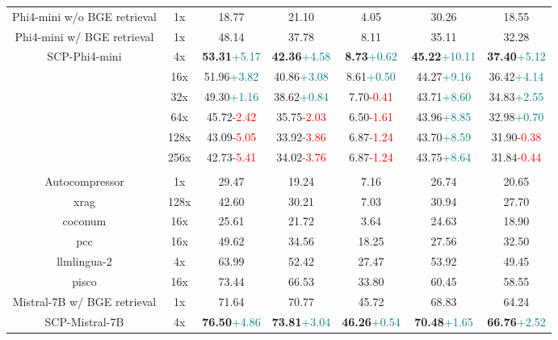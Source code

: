 \documentclass{applemlr}
\numberwithin{equation}{section}
\begin{document}
\begin{table}[!t]
\begin{tabular}{ccccccc}
\cline{2-7}
Phi4-mini w/o BGE retrieval & 1x & 18.77 & 21.10 & 4.05 & 30.26 & 18.55 \\
Phi4-mini w/ BGE retrieval & 1x & 48.14 & 37.78 & 8.11 & 35.11 & 32.28 \\
\multirow{6}{*}{SCP-Phi4-mini } & 4x & \textbf{53.31}\tiny\textcolor{teal}{+5.17} & \textbf{42.36}\tiny\textcolor{teal}{+4.58} & \textbf{8.73}\tiny\textcolor{teal}{+0.62} & \textbf{45.22}\tiny\textcolor{teal}{+10.11} & \textbf{37.40}\tiny\textcolor{teal}{+5.12} \\
 & 16x & 51.96\tiny\textcolor{teal}{+3.82} & 40.86\tiny\textcolor{teal}{+3.08} & 8.61\tiny\textcolor{teal}{+0.50} & 44.27\tiny\textcolor{teal}{+9.16} & 36.42\tiny\textcolor{teal}{+4.14} \\
 & 32x & 49.30\tiny\textcolor{teal}{+1.16} & 38.62\tiny\textcolor{teal}{+0.84} & 7.70\tiny\textcolor{red}{-0.41} & 43.71\tiny\textcolor{teal}{+8.60} & 34.83\tiny\textcolor{teal}{+2.55} \\
 & 64x & 45.72\tiny\textcolor{red}{-2.42} & 35.75\tiny\textcolor{red}{-2.03} & 6.50\tiny\textcolor{red}{-1.61} & 43.96\tiny\textcolor{teal}{+8.85} & 32.98\tiny\textcolor{teal}{+0.70} \\
 & 128x & 43.09\tiny\textcolor{red}{-5.05} & 33.92\tiny\textcolor{red}{-3.86} & 6.87\tiny\textcolor{red}{-1.24} & 43.70\tiny\textcolor{teal}{+8.59} & 31.90\tiny\textcolor{red}{-0.38} \\
 & 256x & 42.73\tiny\textcolor{red}{-5.41} & 34.02\tiny\textcolor{red}{-3.76} & 6.87\tiny\textcolor{red}{-1.24} & 43.75\tiny\textcolor{teal}{+8.64} & 31.84\tiny\textcolor{red}{-0.44} \\
\hline
\rowcolor{gray!15}
\multicolumn{7}{c}{\textbf{Oracle}} \\
\hline
Autocompressor & 1x & 29.47 & 19.24 & 7.16 & 26.74 & 20.65 \\
xrag & 128x & 42.60 & 30.21 & 7.03 & 30.94 & 27.70 \\
coconum & 16x & 25.61 & 21.72 & 3.64 & 24.63 & 18.90 \\
pcc & 16x & 49.62 & 34.56 & 18.25 & 27.56 & 32.50 \\
llmlingua-2 & 4x & 63.99 & 52.42 & 27.47 & 53.92 & 49.45 \\
pisco & 16x & 73.44 & 66.53 & 33.80 & 60.45 & 58.55 \\
\hline
Mistral-7B w/ BGE retrieval & 1x & 71.64 & 70.77 & 45.72 & 68.83 & 64.24 \\
\multirow{6}{*}{SCP-Mistral-7B } & 4x & \textbf{76.50}\tiny\textcolor{teal}{+4.86} & \textbf{73.81}\tiny\textcolor{teal}{+3.04} & \textbf{46.26}\tiny\textcolor{teal}{+0.54} & \textbf{70.48}\tiny\textcolor{teal}{+1.65} & \textbf{66.76}\tiny\textcolor{teal}{+2.52} \\

\end{tabular}
\end{table}
\end{document}
